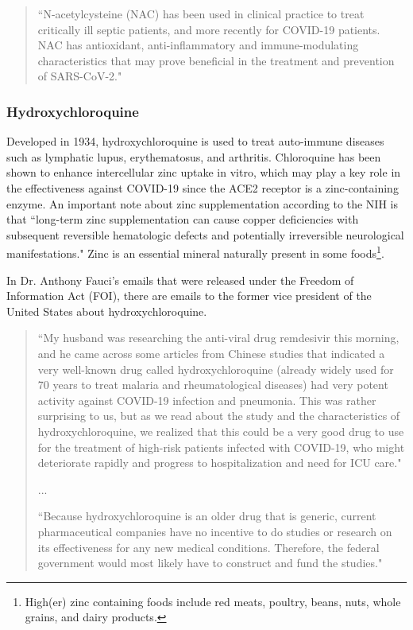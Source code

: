 \documentclass[10pt, a4paper, twocolumn]{book}
\begin{document}
\begin{quotation}
	``N-acetylcysteine (NAC) has been used in clinical practice to treat critically ill septic patients, and more recently for COVID-19 patients. NAC has antioxidant, anti-inflammatory and immune-modulating characteristics that may prove beneficial in the treatment and prevention of SARS-CoV-2." \citep{NACEvidenceReview}
\end{quotation}




\subsubsection{Hydroxychloroquine}

Developed in 1934, hydroxychloroquine is used to treat auto-immune diseases such as lymphatic lupus, erythematosus, and arthritis. Chloroquine has been shown to enhance intercellular zinc uptake in vitro, which may play a key role in the effectiveness against COVID-19 since the ACE2 receptor is a zinc-containing enzyme. An important note about zinc supplementation according to the NIH is that ``long-term zinc supplementation can cause copper deficiencies with subsequent reversible hematologic defects and potentially irreversible neurological manifestations." Zinc is an essential mineral naturally present in some foods\footnote{High(er) zinc containing foods include red meats, poultry, beans, nuts, whole grains, and dairy products.}.

In Dr. Anthony Fauci's emails that were released under the Freedom of Information Act (FOI), there are emails to the former vice president of the United States about hydroxychloroquine.

\begin{quotation}
	``My husband was researching the anti-viral drug remdesivir	this morning, and he came across some articles from Chinese studies that indicated a very well-known drug called hydroxychloroquine (already widely used for 70 years to treat malaria and rheumatological diseases) had very potent activity against COVID-19 infection and pneumonia. This was rather surprising to us, but as we read about the study and the characteristics of hydroxychloroquine, we realized that this could be a very good drug to use for the
	treatment of high-risk patients infected with COVID-19, who might deteriorate rapidly and progress to hospitalization and need for ICU care."
	
	...
	
	``Because hydroxychloroquine is an older drug that is generic, current pharmaceutical companies have no incentive to do studies or research on its effectiveness for any new medical conditions. Therefore, the federal	government would most likely have to construct and fund the studies."
\end{quotation}
\end{document}
